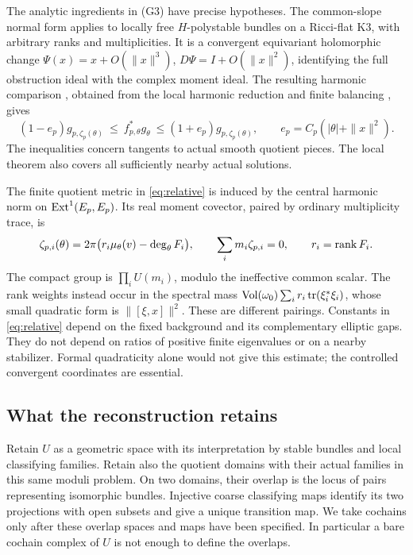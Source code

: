 \medskip
The analytic ingredients in (G3) have precise hypotheses. The
common-slope normal form
\cite[Proposition~2.1]{wuebben17} applies to locally free
\(H\)-polystable bundles on a Ricci-flat K3, with arbitrary ranks and
multiplicities. It is a convergent equivariant holomorphic change
\(\Psi(x)=x+O(\|x\|^3)\), \(D\Psi=I+O(\|x\|^2)\), identifying the
full obstruction ideal with the complex moment ideal.
The resulting harmonic comparison
\cite[Corollary~2.2]{wuebben17}, obtained from the local harmonic
reduction \cite[Theorem~1.1 and Sections~3,5]{wuebben15} and
finite balancing \cite[Theorem~2.1]{wuebben14}, gives
\begin{equation}\label{eq:relative}
 (1-e_p)g_{p,\zeta_p(\theta)}
 \ \leq\ f_{p,\theta}^*g_\theta\
 \leq (1+e_p)g_{p,\zeta_p(\theta)},\qquad
 e_p=C_p(|\theta|+\|x\|^2).
\end{equation}
The inequalities concern tangents to actual smooth quotient pieces.
The local theorem also covers all sufficiently nearby actual solutions.

The finite quotient metric in \eqref{eq:relative} is induced by the
central harmonic norm on \(\operatorname{Ext}^1(E_p,E_p)\). Its real moment covector,
paired by ordinary multiplicity trace, is
\begin{equation}\label{eq:levels}
 \zeta_{p,i}(\theta)=2\pi\bigl(r_i\mu_\theta(v)-\deg_\theta F_i\bigr),
 \qquad \sum_i m_i\zeta_{p,i}=0,\qquad r_i=\operatorname{rank} F_i.
\end{equation}
The compact group is \(\prod_iU(m_i)\), modulo the ineffective common
scalar. The rank weights instead occur in the spectral mass
\(\operatorname{Vol}(\omega_0)\sum_i r_i\operatorname{tr}(\xi_i^*\xi_i)\), whose small quadratic
form is \(\|[\xi,x]\|^2\). These are different pairings.
Constants in \eqref{eq:relative} depend on the fixed background and
its complementary elliptic gaps. They do not depend on ratios of
positive finite eigenvalues or on a nearby stabilizer. Formal
quadraticity alone would not give this estimate; the controlled
convergent coordinates are essential.

\subsection{What the reconstruction retains}\label{subsec:retained}
Retain \(U\) as a geometric space with its interpretation by stable
bundles and local classifying families. Retain also the quotient
domains with their actual families in this same moduli problem.
On two domains, their overlap is the locus of pairs representing
isomorphic bundles. Injective coarse classifying maps identify its
two projections with open subsets and give a unique transition map.
We take cochains only after these overlap spaces and maps have
been specified. In particular a bare cochain complex of \(U\) is not
enough to define the overlaps.

